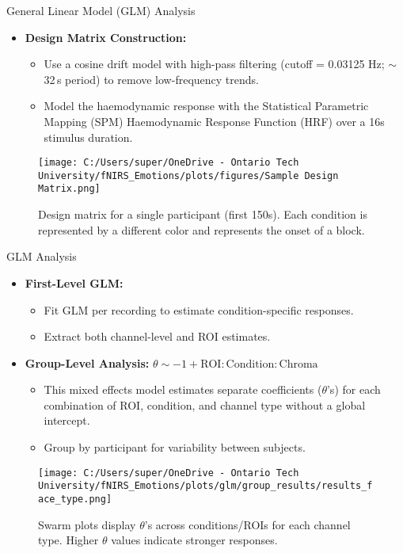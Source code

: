 \documentclass{beamer}
\begin{document}
\begin{frame}{General Linear Model (GLM) Analysis}
    \begin{itemize}
      \item \textbf{Design Matrix Construction:}
        \begin{itemize}
          \item Use a cosine drift model with high-pass filtering (cutoff = 0.03125 Hz; $\sim$32\,s period) to remove low-frequency trends.
          \item Model the haemodynamic response with the Statistical Parametric Mapping (SPM) Haemodynamic Response Function (HRF) over a 16s stimulus duration.
        \end{itemize}
    \end{itemize}
    \begin{figure}
        \texttt{[image: C:/Users/super/OneDrive - Ontario Tech University/fNIRS\_Emotions/plots/figures/Sample Design Matrix.png]}
        \caption{Design matrix for a single participant (first 150s). Each condition is represented by a different color and represents the onset of a block.}
    \end{figure}
\end{frame}

\begin{frame}{GLM Analysis}
    \begin{itemize}
      \item \textbf{First-Level GLM:}
        \begin{itemize}
          \item Fit GLM per recording to estimate condition-specific responses.
          \item Extract both channel-level and ROI estimates.
        \end{itemize}
      \item \textbf{Group-Level Analysis:} $\theta \sim -1 + \text{ROI}:\text{Condition}:\text{Chroma}$
        \begin{itemize}
            \item This mixed effects model estimates separate coefficients ($\theta$'s) for each combination of ROI, condition, and channel type without a global intercept. 
            \item Group by participant for variability between subjects.
        \end{itemize}
    \end{itemize}
    \begin{figure}
        \texttt{[image: C:/Users/super/OneDrive - Ontario Tech University/fNIRS\_Emotions/plots/glm/group\_results/results\_face\_type.png]}
        \caption{Swarm plots display $\theta$'s across conditions/ROIs for each channel type. Higher $\theta$ values indicate stronger responses.}
    \end{figure}
\end{frame}
\end{document}
